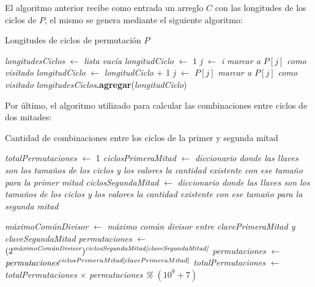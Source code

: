 El algoritmo anterior recibe como entrada un arreglo $C$ con las longitudes de
los ciclos de $P$, el mismo se genera mediante el siguiente algoritmo:

\begin{algorithm}[H]
    \caption{Longitudes de ciclos de permutación $P$}

    \emph{longitudesCiclos} $\gets$ \emph{lista vacía} \;
	\For{\emph{i} \textbf{en} $\left[ 0, |P| \right)$} {
         {
            \emph{longitudCiclo} $\gets$ $1$ \;
            \emph{j} $\gets$ \emph{i} \;
            \emph{marcar a $P[j]$ como visitado} \;
             {
                \emph{longitudCiclo} $\gets$ \emph{longitudCiclo} + 1 \;
                \emph{j} $\gets$ $P[j]$ \;
                \emph{marcar a $P[j]$ como visitado} \;
            }
            \emph{longitudesCiclos}\textbf{.agregar}(\emph{longitudCiclo}) \;
        }
    }
     \;
\end{algorithm}

Por último, el algoritmo utilizado para calcular las combinaciones entre ciclos
de dos mitades:

\begin{algorithm}[H]
    \caption{Cantidad de combinaciones entre los ciclos de la primer y segunda
    mitad}

    \emph{totalPermutaciones} $\gets$ 1 \;
    \emph{ciclosPrimeraMitad} $\gets$ \emph{diccionario donde las llaves son los
    tamaños de los ciclos y los valores la cantidad existente con ese tamaño
    para la primer mitad} \;
    \emph{ciclosSegundaMitad} $\gets$ \emph{diccionario donde las llaves son los
    tamaños de los ciclos y los valores la cantidad existente con ese tamaño
    para la segunda mitad} \;

     {
         {
            \emph{máximoComúnDivisor} $\gets$
                \emph{máximo común divisor entre clavePrimeraMitad y claveSegundaMitad} \;
            \emph{permutaciones} $\gets$
                $(2^{\emph{máximoComúnDivisor}})^{\emph{ciclosSegundaMitad[claveSegundaMitad]}}$ \;
            \emph{permutaciones} $\gets$
            $\emph{permutaciones}^{ciclosPrimeraMitad[clavePrimeraMitad]}$ \;
            \emph{totalPermutaciones} $\gets$
            \emph{totalPermutaciones} $\times$ \emph{permutaciones}
            \emph{\% $(10^9 + 7)$} \;
        }
    }
     \;
\end{algorithm}

